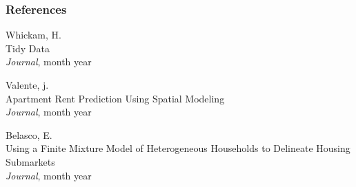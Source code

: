 \documentclass{beamer}
\begin{document}
\begin{frame}
\frametitle{References}
\footnotesize{
	\begin{thebibliography}{99} %
		
		 Whickam, H. \\
		\newblock Tidy Data\\
		\newblock \emph{Journal}, month year
		
    \end{thebibliography}
    
    \begin{thebibliography}{99} %
		
		 Valente, j. \\
		\newblock Apartment Rent Prediction Using Spatial Modeling\\
		\newblock \emph{Journal}, month year
		
    \end{thebibliography}
    
    \begin{thebibliography}{99} %
		
		 Belasco, E. \\
		\newblock Using a Finite Mixture Model of Heterogeneous Households to Delineate Housing Submarkets\\
		\newblock \emph{Journal}, month year
		
	\end{thebibliography}
}
\end{frame}
    
\end{document}
